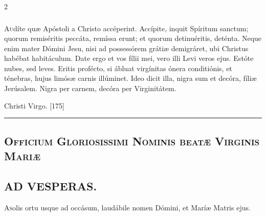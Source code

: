\documentclass[9pt,twoside]{extarticle}
\begin{document}
\begin{multicols}{2}
\subsubsection*{\center {}}
\lettrine{A}udíte quæ Apóstoli a Christo accéperint. Accípite, inquit Spíritum sanctum; quorum remiséritis peccáta, remíssa erunt; et quorum detinuéritis, deténta. Neque enim mater Dómini Jesu, nisi ad possessórem grátiæ demigráret, ubi Christus habébat habitáculum. Date ergo et vos fílii mei, vero illi Levi veros ejus. Estóte nubes, sed leves. Eritis profécto, si ábluat virgínitas ónera conditiónis, et ténebras, hujus limósæ carnis illúminet. Ideo dicit illa, nigra sum et decóra, fíliæ Jerúsalem. Nigra per carnem, decóra per Virginitátem.

\begin{tightlist}{}
\item {} Christi Virgo. [175]
\end{tightlist}

\begin{center}\textcolor{red}{\rule{\linewidth}{0.5pt}} \end{center}

\subsection*{\center \textsc{Officium Gloriosissimi Nominis beatæ Virginis Mariæ}}
\subsubsection*{\center {}}
\begin{center}\end{center}


\subsection*{\center \textsc{AD VESPERAS.}}
\begin{center}\end{center}
\lettrine{A} solis ortu usque ad occásum, laudábile nomen Dómini, et Maríæ Matris ejus.


\end{multicols}
\end{document}
